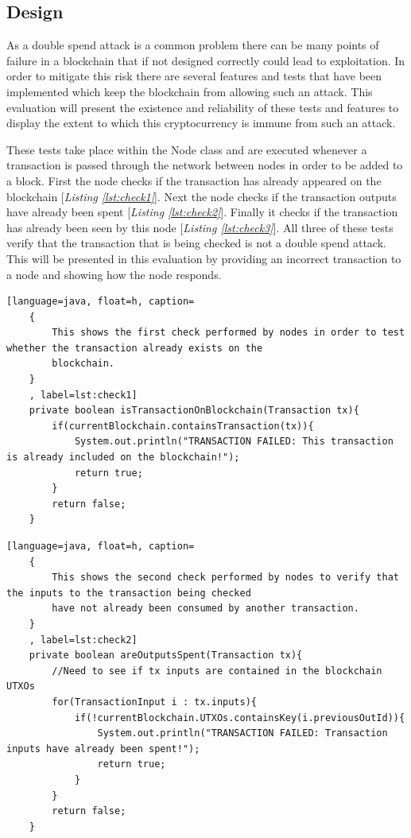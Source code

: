 \documentclass{l4proj}
\begin{document}
\subsection{Design}
As a double spend attack is a common problem there can be many points of failure in a blockchain that if not designed
correctly could lead to exploitation. In order to mitigate this risk there are several features and tests that have been
implemented which keep the blockchain from allowing such an attack. This evaluation will present the existence and 
reliability of these tests and features to display the extent to which this cryptocurrency is immune from such an attack.

These tests take place within the Node class and are executed whenever a transaction is passed through the network
between nodes in order to be added to a block. First the node checks if the transaction has already appeared on the
blockchain [\textit{Listing \ref{lst:check1}}]. Next the node checks if the transaction outputs have already been spent [\textit{Listing \ref{lst:check2}}]. 
Finally it checks if the transaction has already been seen by this node [\textit{Listing \ref{lst:check3}}]. All three of these tests 
verify that the transaction that is being checked is not a double spend attack. This will be presented in this 
evaluation by providing an incorrect transaction to a node and showing how the node responds.

\begin{lstlisting}[language=java, float=h, caption=
    {
        This shows the first check performed by nodes in order to test whether the transaction already exists on the
        blockchain.
    }
    , label=lst:check1]
    private boolean isTransactionOnBlockchain(Transaction tx){
        if(currentBlockchain.containsTransaction(tx)){
            System.out.println("TRANSACTION FAILED: This transaction is already included on the blockchain!");
            return true;
        }
        return false;
    }
\end{lstlisting}

\begin{lstlisting}[language=java, float=h, caption=
    {
        This shows the second check performed by nodes to verify that the inputs to the transaction being checked
        have not already been consumed by another transaction.
    }
    , label=lst:check2]
    private boolean areOutputsSpent(Transaction tx){
        //Need to see if tx inputs are contained in the blockchain UTXOs
        for(TransactionInput i : tx.inputs){
            if(!currentBlockchain.UTXOs.containsKey(i.previousOutId)){
                System.out.println("TRANSACTION FAILED: Transaction inputs have already been spent!");
                return true;
            }
        }
        return false;
    }
\end{lstlisting}
\end{document}
